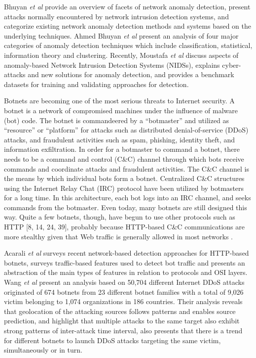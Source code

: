 \documentclass[review]{elsarticle}
\begin{document}
Bhuyan \emph{et al} \cite{acarali2016survey} provide an overview of facets of network anomaly detection, present attacks normally encountered by network intrusion detection systems, and categorize existing network anomaly detection methods and systems based on the underlying techniques. Ahmed Bhuyan \emph{et al} \cite{acarali2016survey} present an analysis of four major categories of anomaly detection techniques which include classification, statistical, information theory and clustering. Recently, Moustafa \emph{et al} \cite{moustafa2019holistic} discuss aspects of anomaly-based Network Intrusion Detection Systems (NIDSs), explains cyber-attacks and new solutions for anomaly detection, and provides a benchmark datasets for training and validating approaches for detection. 

Botnets are becoming one of the most serious threats to Internet security. A botnet is a network of compromised machines under the influence of malware (bot) code. The botnet is commandeered by a “botmaster” and utilized as “resource” or “platform” for attacks such as distributed denial-of-service (DDoS) attacks, and fraudulent activities such as spam, phishing, identity theft, and information exfiltration. In order for a botmaster to command a botnet, there needs to be a command and control (C\&C) channel through which bots receive commands and coordinate attacks and fraudulent activities. The C\&C channel is the means by which individual bots form a botnet. Centralized C\&C structures using the Internet Relay Chat (IRC) protocol have been utilized by botmasters for a long time. In this architecture, each bot logs into an IRC channel, and seeks commands from the botmaster. Even today, many botnets are still designed this way. Quite a few botnets, though, have begun to use other protocols such as HTTP [8, 14, 24, 39], probably because HTTP-based C\&C communications are more stealthy given that Web traffic is generally allowed in most networks \cite{gu2008botminer}.

Acarali \emph{et al} \cite{acarali2016survey} surveys recent network-based detection approaches for HTTP-based botnets, surveys traffic-based features used to detect bot traffic and presents an abstraction of the main types of features in relation to protocols and OSI layers. Wang \emph{et al} \cite{Wang2018ddosbotnetssurvey} present an analysis based on 50,704 different Internet DDoS attacks originated of 674 botnets from 23 different botnet families with a total of 9,026 victim belonging to 1,074 organizations in 186 countries. Their analysis reveals that geolocation of the attacking sources follows patterns and enables source prediction, and highlight that multiple attacks to the same target also exhibit strong patterns of inter-attack time interval, also presents that there is a trend for different botnets to launch DDoS attacks targeting the same victim, simultaneously or in turn.
\end{document}
